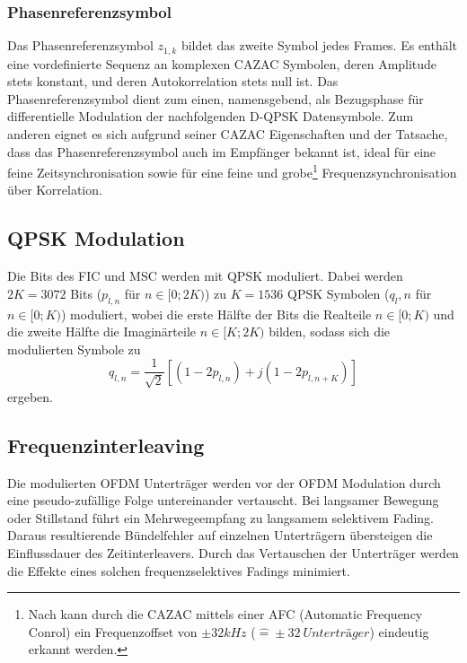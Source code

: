 \subsubsection{Phasenreferenzsymbol}
\label{sec:phasenreferenzsymbol}
Das Phasenreferenzsymbol $z_{1,k}$ bildet das zweite Symbol jedes Frames. Es enthält eine vordefinierte Sequenz an komplexen \ac{CAZAC} Symbolen, deren Amplitude stets konstant, und deren Autokorrelation stets null ist. Das Phasenreferenzsymbol dient zum einen, namensgebend, als Bezugsphase für differentielle Modulation der nachfolgenden D-QPSK Datensymbole. Zum anderen eignet es sich aufgrund seiner \ac{CAZAC} Eigenschaften und der Tatsache, dass das Phasenreferenzsymbol auch im Empfänger bekannt ist, ideal für eine feine Zeitsynchronisation sowie für eine feine und grobe\footnote{Nach \cite{dab_buch} kann durch die CAZAC mittels einer AFC (Automatic Frequency Conrol) ein Frequenzoffset von $\pm 32kHz$ ($\hat{=} \pm 32 \: Unterträger$) eindeutig erkannt werden.} Frequenzsynchronisation über Korrelation.

\subsection{QPSK Modulation}
\label{sec:qpsk}
Die Bits des FIC und MSC werden mit QPSK moduliert. Dabei werden $2K=3072$ Bits ($p_{l,n}$ für $n\in[0;2K)$) zu $K=1536$ QPSK Symbolen ($q_l,n$ für $n\in[0;K)$) moduliert, wobei die erste Hälfte der Bits die Realteile $n\in [0;K)$ und die zweite Hälfte die Imaginärteile $n\in [K;2K)$ bilden, sodass sich die modulierten Symbole zu
\begin{equation}
q_{l,n} = \frac{1}{\sqrt{2}}\left[\left(1-2p_{l,n}\right)+j\left(1-2p_{l,n+K}\right)\right]
\end{equation}
ergeben.

\subsection{Frequenzinterleaving}
Die modulierten OFDM Unterträger werden vor der OFDM Modulation durch eine pseudo-zufällige Folge untereinander vertauscht. Bei langsamer Bewegung oder Stillstand führt ein Mehrwegeempfang zu langsamem selektivem Fading. Daraus resultierende Bündelfehler auf einzelnen Unterträgern übersteigen die Einflussdauer des Zeitinterleavers. Durch das Vertauschen der Unterträger werden die Effekte eines solchen frequenzselektives Fadings minimiert. 


